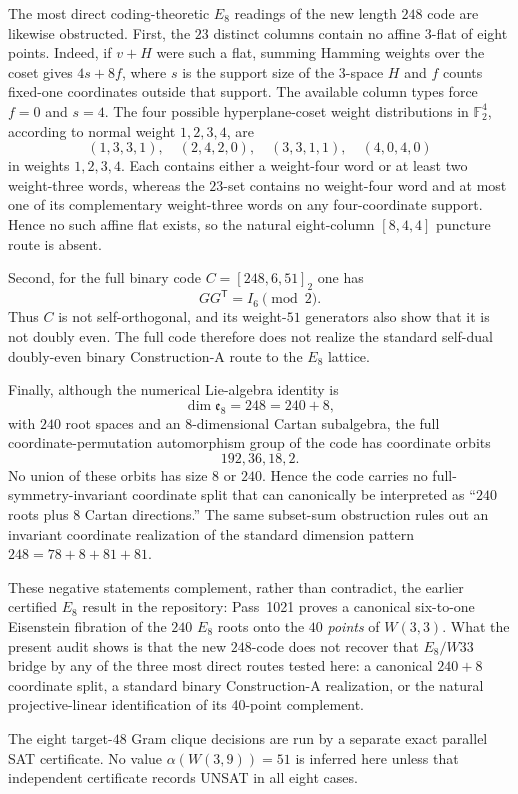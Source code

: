 The most direct coding-theoretic $E_8$ readings of the new length $248$ code are likewise obstructed.  First, the $23$ distinct columns contain no affine $3$-flat of eight points.  Indeed, if $v+H$ were such a flat, summing Hamming weights over the coset gives $4s+8f$, where $s$ is the support size of the $3$-space $H$ and $f$ counts fixed-one coordinates outside that support.  The available column types force $f=0$ and $s=4$.  The four possible hyperplane-coset weight distributions in $\mathbb F_2^4$, according to normal weight $1,2,3,4$, are
\[
 (1,3,3,1),\quad(2,4,2,0),\quad(3,3,1,1),\quad(4,0,4,0)
\]
in weights $1,2,3,4$.  Each contains either a weight-four word or at least two weight-three words, whereas the $23$-set contains no weight-four word and at most one of its complementary weight-three words on any four-coordinate support.  Hence no such affine flat exists, so the natural eight-column $[8,4,4]$ puncture route is absent.

Second, for the full binary code $C=[248,6,51]_2$ one has
\[
 GG^{\mathsf T}=I_6\pmod2.
\]
Thus $C$ is not self-orthogonal, and its weight-$51$ generators also show that it is not doubly even.  The full code therefore does not realize the standard self-dual doubly-even binary Construction-A route to the $E_8$ lattice.

Finally, although the numerical Lie-algebra identity is
\[
 \dim\mathfrak e_8=248=240+8,
\]
with $240$ root spaces and an $8$-dimensional Cartan subalgebra, the full coordinate-permutation automorphism group of the code has coordinate orbits
\[
 \boxed{192,36,18,2}.
\]
No union of these orbits has size $8$ or $240$.  Hence the code carries no full-symmetry-invariant coordinate split that can canonically be interpreted as ``$240$ roots plus $8$ Cartan directions.''  The same subset-sum obstruction rules out an invariant coordinate realization of the standard dimension pattern $248=78+8+81+81$.

These negative statements complement, rather than contradict, the earlier certified $E_8$ result in the repository: Pass~1021 proves a canonical six-to-one Eisenstein fibration of the $240$ $E_8$ roots onto the $40$ \emph{points} of $W(3,3)$.  What the present audit shows is that the new $248$-code does not recover that $E_8/W33$ bridge by any of the three most direct routes tested here: a canonical $240+8$ coordinate split, a standard binary Construction-A realization, or the natural projective-linear identification of its $40$-point complement.

The eight target-$48$ Gram clique decisions are run by a separate exact parallel SAT certificate.  No value $\alpha(W(3,9))=51$ is inferred here unless that independent certificate records UNSAT in all eight cases.
